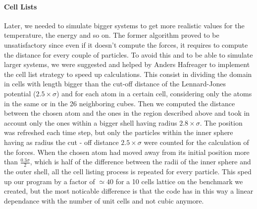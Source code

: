 \documentclass[10pt,a4paper,titlepage]{article}
\begin{document}
\noindent \paragraph{Cell Lists} Later, we needed to simulate bigger systems to get more realistic values for the temperature, the energy and so on. The former algorithm proved to be unsatisfactory since even if it doesn't compute the forces, it requires to compute the distance for every couple of particles. To avoid this and to be able to simulate larger systems, we were suggested and helped by Anders Hafreager to implement the cell list strategy to speed up calculations. This consist in dividing the domain in cells with length bigger than the cut-off distance of the Lennard-Jones potential ($2.5\times \sigma$) and for each atom in a certain cell, considering only the atoms in the same or in the 26 neighboring cubes. Then we computed the distance between the chosen atom and the ones in the region described above and took in account only the ones within a bigger shell having radius $2.8 \times \sigma$. The position was refreshed each time step, but only the particles within the inner sphere having as radius the cut - off distance $2.5 \times \sigma$  were counted for the calculation of the forces. When the chosen atom had moved away from its initial position more than $\frac{0.3 \sigma}{2}$, which is half of the difference between the radii of the inner sphere and the outer shell, all the cell listing process is repeated for every particle. This sped up our program by a factor of $\simeq 40$ for a 10 cells lattice on the benchmark we created, but the most noticable difference is that the code has in this way a linear dependance with the number of unit cells and not cubic anymore.
\end{document}
